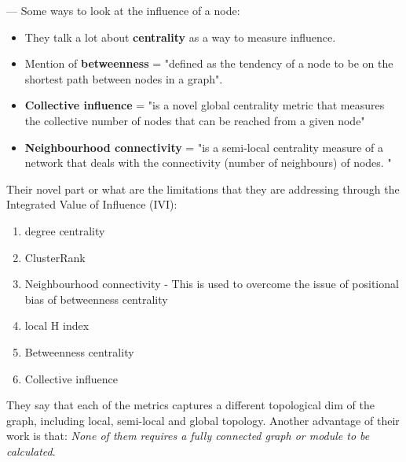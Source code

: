 --- 
Some ways to look at the influence of a node: 

\begin{itemize}
    \item They talk a lot about \textbf{centrality} as a way to measure influence.
    \item Mention of \textbf{betweenness} = "defined as the tendency of a node to be on the shortest path between nodes in a graph".
    \item \textbf{Collective influence} =  "is a novel global centrality metric that measures the collective number of nodes that can be reached from a given node" 
    \item\textbf{ Neighbourhood connectivity} = "is a semi-local centrality measure of a network that deals with the connectivity (number of neighbours) of nodes. "

\end{itemize}

Their novel part or what are the limitations that they are addressing through the Integrated Value of Influence (IVI):

\begin{enumerate}
    \item degree centrality 
    \item ClusterRank
    \item Neighbourhood connectivity - This is used to overcome the issue of positional bias of betweenness centrality
    \item local H index
    \item Betweenness centrality  
    \item Collective influence 
\end{enumerate}


They say that each of the metrics captures a different topological dim of the graph, including local, semi-local and global topology. Another advantage of their work is that: \textit{None of them requires a fully connected graph or module to be calculated}.



\newpage


 


